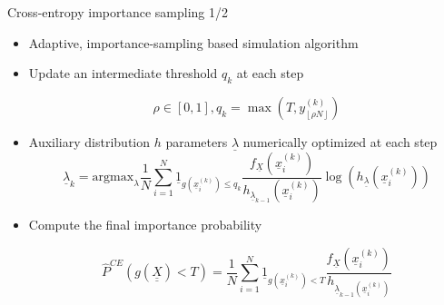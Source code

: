 \documentclass[aspectratio=169]{beamer}
\begin{document}

\begin{frame}{Cross-entropy importance sampling 1/2}

\begin{itemize}
\item Adaptive, importance-sampling based simulation algorithm

\item Update an intermediate threshold $q_k$ at each step

$$\rho \in [0,1], q_k=\max(T,y^{(k)}_{\left \lfloor \rho N \right\rfloor})$$

\item Auxiliary distribution $h$ parameters $\underline{\lambda}$ numerically optimized at each step
$$\underline{\lambda}_{k}= \textrm{argmax}_{\lambda} \frac{1}{N} \sum_{i=1}^{N}{\underline{1}}_{g(\underline{x}_i^{(k)}) \leq q_k} \frac{f_\underline{X}(\underline{x}_i^{(k)})}{h_{\underline{\lambda}_{k-1}}(\underline{x}_i^{(k)})} \log(h_{\underline{\lambda}}(\underline{x}_i^{(k)}))$$

\item Compute the final importance probability

$$\widehat{P}^{CE}(g(\underline{\underline{X}})<T)=\frac{1}{N}\displaystyle \sum_{i=1}^{N} \underline{1}_{g(\underline{x}_i^{(k)})<T} \frac{f_\underline{X}(\underline{x}_i^{(k)})}{h_{\underline{\lambda}_{k-1}(\underline{x}_i^{(k)})}}$$

\end{itemize}
\end{frame}
\end{document}
